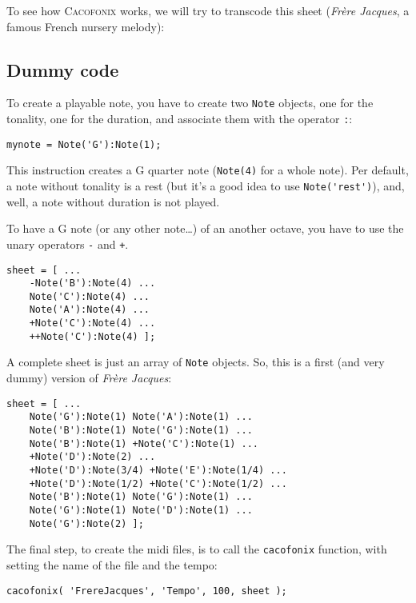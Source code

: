 \documentclass{article}
\newcommand{\cacofonix}{\textsc{Cacofonix}\xspace}
\newcommand{\note}{\lstinline!Note!\xspace}
\newcommand{\frerejaques}{\emph{Fr\`ere Jacques}\xspace}
\begin{document}
To see how \cacofonix works, we will try to transcode this sheet (\frerejaques, a famous French nursery melody):\\

\subsection{Dummy code}

To create a playable note, you have to create two \note objects, one for the tonality, one for the duration, and associate them with the operator \lstinline!:!:
\begin{lstlisting}
mynote = Note('G'):Note(1);
\end{lstlisting}
This instruction creates a G quarter note (\lstinline!Note(4)! for a whole note). Per default, a note without tonality is a rest (but it's a good idea to use \lstinline!Note('rest')!), and, well, a note without duration is not played.

To have a G note (or any other note\dots) of an another octave, you have to use the unary operators \lstinline!-! and \lstinline!+!. \\
\begin{lstlisting}
sheet = [ ...
	-Note('B'):Note(4) ...
	Note('C'):Note(4) ...
	Note('A'):Note(4) ...
	+Note('C'):Note(4) ...
	++Note('C'):Note(4) ];
\end{lstlisting}

A complete sheet is just an array of \note objects. So, this is a first (and very dummy) version of \frerejaques:
\begin{lstlisting}
sheet = [ ...
	Note('G'):Note(1) Note('A'):Note(1) ...
	Note('B'):Note(1) Note('G'):Note(1) ...
	Note('B'):Note(1) +Note('C'):Note(1) ...
	+Note('D'):Note(2) ...
	+Note('D'):Note(3/4) +Note('E'):Note(1/4) ...
	+Note('D'):Note(1/2) +Note('C'):Note(1/2) ...
	Note('B'):Note(1) Note('G'):Note(1) ...
	Note('G'):Note(1) Note('D'):Note(1) ...
	Note('G'):Note(2) ];
\end{lstlisting}

The final step, to create the midi files, is to call the \lstinline!cacofonix! function, with setting the name of the file and the tempo:
\begin{lstlisting}
cacofonix( 'FrereJacques', 'Tempo', 100, sheet );
\end{lstlisting}
\end{document}
